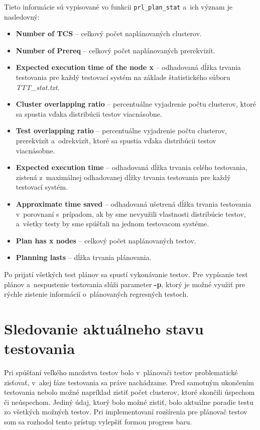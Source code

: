 \noindent Tieto informácie sú vypisované vo funkcii \texttt{prl\_plan\_stat} 
a~ich význam je nasledovný:
\begin{itemize}
\item \textbf{Number of TCS} -- celkový počet naplánovaných clusterov.
\item \textbf{Number of Prereq} -- celkový počet naplánovaných prerekvizít.
\item \textbf{Expected execution time of the node x} -- odhadovaná dĺžka
trvania testovania pre každý testovací systém na 
základe štatistického súboru \textit{TTT\_stat.txt}.
\item \textbf{Cluster overlapping ratio} -- percentuálne vyjadrenie počtu
clusterov, ktoré sa spustia vďaka distribúcii testov viacnásobne. 
\item \textbf{Test overlapping ratio} -- percentuálne vyjadrenie počtu
clusterov, prerekvizít a~odrekvizít, ktoré sa spustia vďaka 
distribúcii testov viacnásobne.
\item \textbf{Expected execution time} -- odhadovaná dĺžka
trvania celého testovania, zistená z~maximálnej odhadovanej dĺžky trvania
testovania pre každý testovací systém.
\item \textbf{Approximate time saved} -- odhadovaná ušetrená dĺžka trvania 
testovania v~porovnaní s~prípadom, ak by sme nevyužili vlastnosti distribúcie testov,
a~všetky testy by sme spúšťali na jednom testovacom systéme.
\item \textbf{Plan has x nodes} -- celkový počet naplánovaných testov.
\item \textbf{Planning lasts} -- dĺžka trvania plánovania.
\end{itemize}

Po prijatí všetkých test plánov sa spustí vykonávanie testov. 
Pre vypísanie test plánov a~nespustenie testovania slúži parameter 
\textbf{-p}, ktorý je možné využiť pre rýchle zistenie informácií 
o~plánovaných regresných testoch.


\section{Sledovanie aktuálneho stavu testovania}
\label{sekcia:sledovanie_stavu}
Pri spúšťaní veľkého množstva testov bolo v~plánovači testov problematické
zisťovať, v~akej fáze testovania sa práve nachádzame. 
Pred samotným ukončením testovania nebolo možné napríklad zistiť počet 
clusterov, ktoré skončili úspechom či neúspechom. 
Jediný údaj, ktorý bolo možné zistiť, bolo aktuálne poradie testu
zo všetkých možných testov.
Pri implementovaní rozšírenia pre plánovač testov som sa rozhodol tento
prístup vylepšiť formou progress baru.

